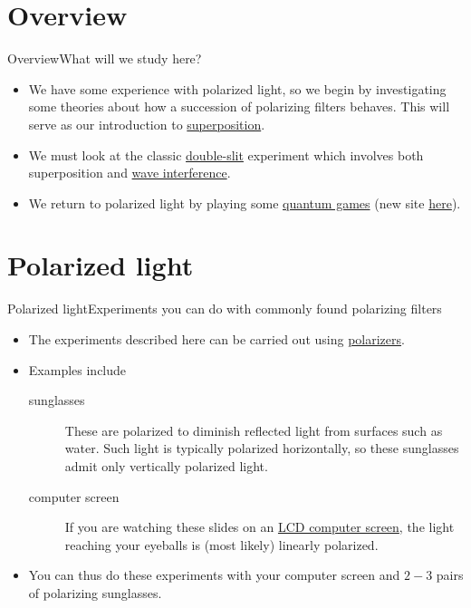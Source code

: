 
\section{Overview}
\begin{frame}{Overview}{What will we study here?}
\begin{itemize}
    \item We have some experience with polarized light, so we begin by investigating some theories about how a succession of polarizing filters behaves.  This will serve as our introduction to \href{https://en.wikipedia.org/wiki/Quantum_superposition}{superposition}.
    \item We must look at the classic \href{https://en.wikipedia.org/wiki/Double-slit_experiment}{double-slit} experiment which involves both superposition and \href{https://en.wikipedia.org/wiki/Wave_interference}{wave interference}.
    \item We return to polarized light by playing some \href{http://play.quantumgame.io/}{quantum games} (new site \href{https://lab.quantumflytrap.com/lab}{here}).
\end{itemize}
    
\end{frame}
\section{Polarized light}

\begin{frame}{Polarized light}{Experiments you can do with commonly found polarizing filters}
\begin{itemize}
    \item The experiments described here can be carried out using \href{https://en.wikipedia.org/wiki/Polarizer}{polarizers}.
    \item Examples include
    \begin{description}
        \item[sunglasses] These are polarized to diminish reflected light from surfaces such as water.  Such light is typically polarized horizontally, so these sunglasses admit only vertically polarized light.
        \item[computer screen]  If you are watching these slides on an \href{https://en.wikipedia.org/wiki/Liquid-crystal_display}{LCD computer screen}, the light reaching your eyeballs is (most likely) linearly polarized.
    \end{description}
    \item You can thus do these experiments with your computer screen and $2-3$ pairs of polarizing sunglasses.
    
\end{itemize}
\end{frame}

